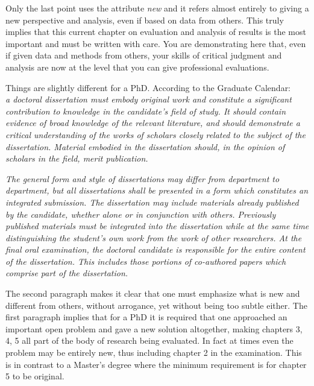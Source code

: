 Only the last point uses the attribute \textit{new} and it refers almost entirely to giving a new perspective and analysis, even if based on data from others. This truly implies that this current chapter on evaluation and analysis of results is the most important and must be written with care. You are demonstrating here that, even if given data and methods from others, your skills of critical judgment and analysis are now at the level that you can give professional evaluations.

Things are slightly different for a PhD. According to the Graduate Calendar: \\ 
\textit{a doctoral dissertation must embody original work and constitute a significant contribution to knowledge in the candidate's field of study. It should contain evidence of broad knowledge of the relevant literature, and should demonstrate a critical understanding of the works of scholars closely related to the subject of the dissertation. Material embodied in the dissertation should, in the opinion of scholars in the field, merit publication.}

\textit{The general form and style of dissertations may differ from department to department, but all dissertations shall be presented in a form which constitutes an integrated submission. The dissertation may include materials already published by the candidate, whether alone or in conjunction with others. Previously published materials must be integrated into the dissertation while at the same time distinguishing the student's own work from the work of other researchers. At the final oral examination, the doctoral candidate is responsible for the entire content of the dissertation. This includes those portions of co-authored papers which comprise part of the dissertation.}

The second paragraph makes it clear that one must emphasize what is new and different from others, without arrogance, yet without being too subtle either. The first paragraph implies that for a PhD it is required that one approached an important open problem and gave a new solution altogether, making chapters 3, 4, 5 all part of the body of research being evaluated. In fact at times even the problem may be entirely new, thus including chapter 2 in the examination. This is in contrast to a Master's degree where the minimum requirement is for chapter 5 to be original.